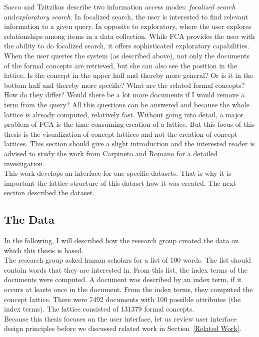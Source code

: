 \documentclass[11pt]{report}
\begin{document}
Sacco and Tzitzikas \cite{Sacco2009} describe two information access modes: \textit{focalized search} and\textit{exploratory search}. In focalized search, the user is interested to find relevant information to a given query. In opposite to exploratory, where the user explores relationships among items in a data collection. While FCA provides the user with the ability to do focalized search, it offers sophisticated exploratory capabilities. When the user queries the system (as described above), not only the documents of the formal concepts are retrieved, but she can also see the position in the lattice. Is the concept in the upper half and thereby more general? Or is it in the bottom half and thereby more specific? What are the related formal concepts? How do they differ? Would there be a lot more documents if I would remove a term from the query? All this questions can be answered and because the whole lattice is already computed, relatively fast. Without going into detail, a major problem of FCA is the time-consuming creation of a lattice. But this focus of this thesis is the visualization of concept lattices and not the creation of concept lattices. This section should give a slight introduction and the interested reader is advised to study the work from Carpineto and Romano \cite{carpineto2004concept} for a detailed investigation. \\

This work develops an interface for one specific datasets. That is why it is important the lattice structure of this dataset how it was created. The next section described the dataset.

\subsection{The Data}
\label{thedata}
In the following, I will described how the research group created the data on which this thesis is based. \\

The research group asked human scholars for a list of 100 words. The list should contain words that they are interested in. From this list, the index terms of the documents were computed. A document was described by an index term, if it occurs at leaste once in the document. From the index terms, they computed the concept lattice. There were 7492 documents with 100 possible attributes (the index terms). The lattice consisted of 131379 formal concepts.\\

Because this thesis focuses on the user interface, let us review user interface design principles before we discussed related work in Section~\ref{Related Work}.
\end{document}
